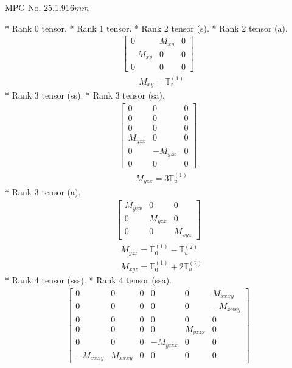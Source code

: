 \documentclass[fleqn,8pt,landscape]{jsarticle}
\begin{document}
\setcounter{MaxMatrixCols}{32}

\renewcommand{\tablename}{Table~}
\renewcommand{\figurename}{Figure~}
\begin{center}
\LARGE
MPG No. 25.1.91\quad$6mm$
\end{center}
* Rank 0 tensor.
* Rank 1 tensor.
* Rank 2 tensor (s).
* Rank 2 tensor (a).
\begin{align*}
\begin{bmatrix} 0 & M_{xy} & 0 \\ - M_{xy} & 0 & 0 \\ 0 & 0 & 0 \end{bmatrix}
\end{align*}
\begin{align*}
& M_{xy} = \mathbb{T}_{z}^{(1)}
\end{align*}
* Rank 3 tensor (ss).
* Rank 3 tensor (sa).
\begin{align*}
\begin{bmatrix} 0 & 0 & 0 \\ 0 & 0 & 0 \\ 0 & 0 & 0 \\ M_{yzx} & 0 & 0 \\ 0 & - M_{yzx} & 0 \\ 0 & 0 & 0 \end{bmatrix}
\end{align*}
\begin{align*}
& M_{yzx} = 3 \mathbb{T}_{u}^{(1)}
\end{align*}
* Rank 3 tensor (a).
\begin{align*}
\begin{bmatrix} M_{yzx} & 0 & 0 \\ 0 & M_{yzx} & 0 \\ 0 & 0 & M_{xyz} \end{bmatrix}
\end{align*}
\begin{align*}
& M_{yzx} = \mathbb{T}_{0}^{(1)} - \mathbb{T}_{u}^{(2)} \\
& M_{xyz} = \mathbb{T}_{0}^{(1)} + 2 \mathbb{T}_{u}^{(2)}
\end{align*}
* Rank 4 tensor (sss).
* Rank 4 tensor (ssa).
\begin{align*}
\begin{bmatrix} 0 & 0 & 0 & 0 & 0 & M_{xxxy} \\ 0 & 0 & 0 & 0 & 0 & - M_{xxxy} \\ 0 & 0 & 0 & 0 & 0 & 0 \\ 0 & 0 & 0 & 0 & M_{yzzx} & 0 \\ 0 & 0 & 0 & - M_{yzzx} & 0 & 0 \\ - M_{xxxy} & M_{xxxy} & 0 & 0 & 0 & 0 \end{bmatrix}
\end{align*}
\end{document}
